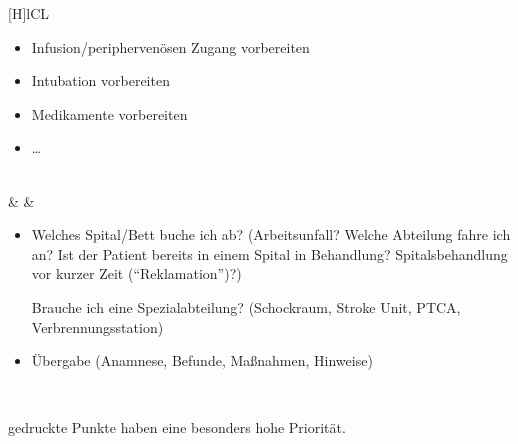 {\begin{minipage}{\linewidth}
{\begin{tabulary}{\linewidth}[H]{lCL}
\begin{minipage}{\linewidth}
\begin{itemize}
  \item Infusion/periphervenösen Zugang vorbereiten
  \item Intubation vorbereiten
  \item Medikamente vorbereiten
  \item \ldots
\end{itemize}
\end{minipage}
\\\addlinespace\midrule\addlinespace
{}
&
&
\begin{minipage}{\linewidth}
\begin{itemize}
  \item Welches Spital/Bett buche ich ab? {\tiny(Arbeitsunfall?
  Welche Abteilung fahre ich an? Ist der Patient bereits in
  einem Spital in Behandlung? Spitalsbehandlung vor kurzer
  Zeit (\enquote{Reklamation})?)}
  
  Brauche ich eine Spezialabteilung? {\tiny(Schockraum, Stroke
  Unit, PTCA, Verbrennungsstation)}
  \item Übergabe {\tiny(Anamnese, Befunde, Maßnahmen, Hinweise)}
\end{itemize}
\end{minipage}

\\\addlinespace\bottomrule
\end{tabulary}}

{\scriptsize{} gedruckte Punkte haben eine besonders hohe Priorität.}
\end{minipage}
}%
{}%


\vfill
\restoregeometry\pagestyle{fancy}

\clearpage

\section{}

